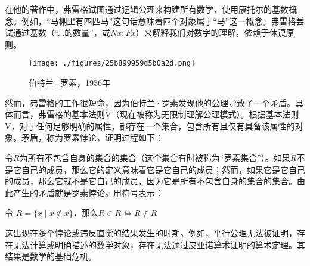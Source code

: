 在他的著作中，弗雷格试图通过逻辑公理来构建所有数学，使用康托尔的基数概念。例如，“马棚里有四匹马”这句话意味着四个对象属于“马”这一概念。弗雷格尝试通过基数（“...的数量”，或$Nx: Fx$）来解释我们对数字的理解，依赖于休谟原则。
\begin{figure}[ht]
\centering
\texttt{[image: ./figures/25b899959d5b0a2d.png]}
\caption{伯特兰·罗素，1936年} \label{fig_Set1_5}
\end{figure}
然而，弗雷格的工作很短命，因为伯特兰·罗素发现他的公理导致了一个矛盾。具体而言，弗雷格的基本法则V（现在被称为无限制理解公理模式）。根据基本法则V，对于任何足够明确的属性，都存在一个集合，包含所有且仅有具备该属性的对象。矛盾，称为罗素悖论，证明过程如下：

令$R$为所有不包含自身的集合的集合（这个集合有时被称为“罗素集合”）。如果$R$不是它自己的成员，那么它的定义意味着它是它自己的成员；然而，如果它是它自己的成员，那么它就不是它自己的成员，因为它是所有不包含自身的集合的集合。由此产生的矛盾就是罗素悖论。用符号表示：

令  
$R = \{x \mid x \notin x\}$，那么$R \in R \iff R \notin R$  

这出现在多个悖论或违反直觉的结果发生的时期。例如，平行公理无法被证明，存在无法计算或明确描述的数学对象，存在无法通过皮亚诺算术证明的算术定理。其结果是数学的基础危机。

